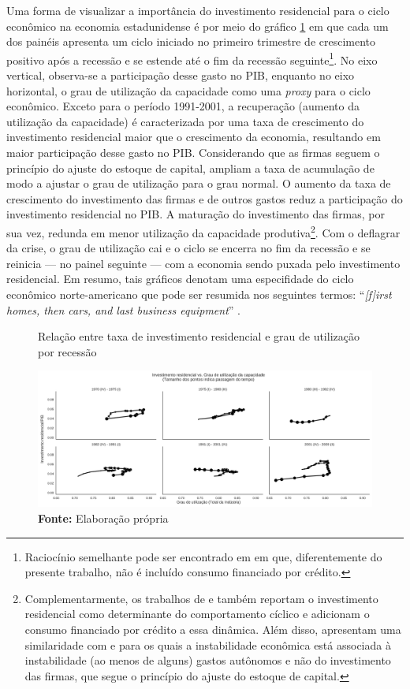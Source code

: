 Uma forma de visualizar a importância do investimento residencial para o ciclo econômico na economia estadunidense é por meio do gráfico \ref{FigIh_u} em que cada um dos painéis apresenta um ciclo iniciado no primeiro trimestre de crescimento positivo após a recessão e se estende até o fim da recessão seguinte\footnote{
	Raciocínio semelhante pode ser encontrado em \textcite{fiebiger_semi-autonomous_2018} em que, diferentemente do presente trabalho, não é incluído consumo financiado por crédito.}. 
No eixo vertical, observa-se a participação desse gasto no PIB, enquanto no eixo horizontal, o grau de utilização da capacidade como uma \textit{proxy} para o ciclo econômico. Exceto para o período 1991-2001, a recuperação (aumento da utilização da capacidade) é caracterizada por uma taxa de crescimento do investimento residencial maior que o crescimento da economia, resultando em maior participação desse gasto no PIB. Considerando que as firmas seguem o princípio do ajuste do estoque de capital, ampliam a taxa de acumulação de modo a ajustar o grau de utilização para o grau normal. O aumento da taxa de crescimento do investimento das firmas e de outros gastos reduz a participação do investimento residencial no PIB. A maturação do investimento das firmas, por sua vez, redunda em menor utilização da capacidade produtiva\footnote{
	Complementarmente, os trabalhos de \textcite{fiebiger_semi-autonomous_2018} e \textcite{fiebiger_trend_2017} também reportam o investimento residencial como determinante do comportamento cíclico e adicionam o consumo financiado por crédito a essa dinâmica. Além disso, apresentam uma similaridade com \textcite{dejuan_hidden_2017} e \textcite{teixeira_crescimento_2015} para os quais a instabilidade econômica está associada à instabilidade (ao menos de alguns) gastos autônomos e não do investimento das firmas, que segue o princípio do ajuste do estoque de capital.}. 
Com o deflagrar da crise, o grau de utilização cai e o ciclo se encerra no fim da recessão e se reinicia --- no painel seguinte --- com a economia sendo puxada pelo investimento residencial.
Em resumo, tais gráficos denotam uma especifidade do ciclo econômico norte-americano que pode ser resumida nos seguintes termos: ``\textit{[f]irst homes, then cars, and last business equipment}'' \cite[p.~8]{leamer_housing_2007}.




\begin{figure}[H]
	\centering
	\caption{Relação entre taxa de investimento residencial e grau de utilização por recessão}
	\label{FigIh_u}
	\includegraphics[width=\textwidth]{../../Dados/Fatos_Estilizados/figs/Ciclo_Ih_u.png}
	\caption*{\textbf{Fonte:} Elaboração própria}
\end{figure}

